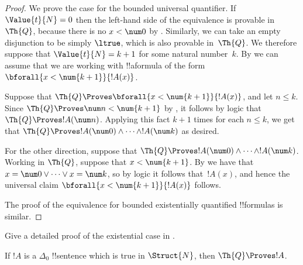 \documentclass[../../../include/open-logic-section]{subfiles}
\begin{document}
\begin{proof}
    We prove the case for the bounded universal quantifier.
    If $\Value{t}{N} = 0$ then the left-hand side of the
    equivalence is provable in~$\Th{Q}$, because there is no
    $x<\num 0$ by .
    Similarly, we can take an empty disjunction to be simply
    $\ltrue$, which is also provable in~$\Th{Q}$.
    We therefore suppose that $\Value{t}{N} = k+1$ for some
    natural number~$k$. By  we
    can assume that we are working with !!a{formula} of the
    form $\bforall{x<\num{k+1}}{!A(x)}$.
    
    Suppose that $\Th{Q} \Proves \bforall{x<\num{k+1}}{!A(x)}$,
    and let $n \leq k$. Since $\Th{Q} \Proves \num n < \num{k+1}$
    by , it follows by logic that
    $\Th{Q} \Proves !A(\num n)$. Applying this fact $k+1$ times
    for each $n \leq k$, we get that $\Th{Q} \Proves !A(\num 0)
    \land \dots \land !A(\num k)$ as desired.
    
    For the other direction, suppose that $\Th{Q} \Proves
    !A(\num 0) \land \dots \land !A(\num k)$. Working in
    $\Th{Q}$, suppose that $x < \num{k+1}$.
    By  we have that
    $x = \num 0 \lor \dots \lor x = \num k$, so by logic it
    follows that~$!A(x)$, and hence the universal claim
    $\bforall{x<\num{k+1}}{!A(x)}$ follows.
    
    The proof of the equivalence for bounded existentially
    quantified !!{formula}s is similar.
\end{proof}

\begin{prob}
Give a detailed proof of the existential case in
.
\end{prob}

\begin{lem}
If $!A$ is a $\Delta_0$ !!{sentence} which is true in
$\Struct{N}$, then $\Th{Q} \Proves !A$.
\end{lem}
\end{document}
